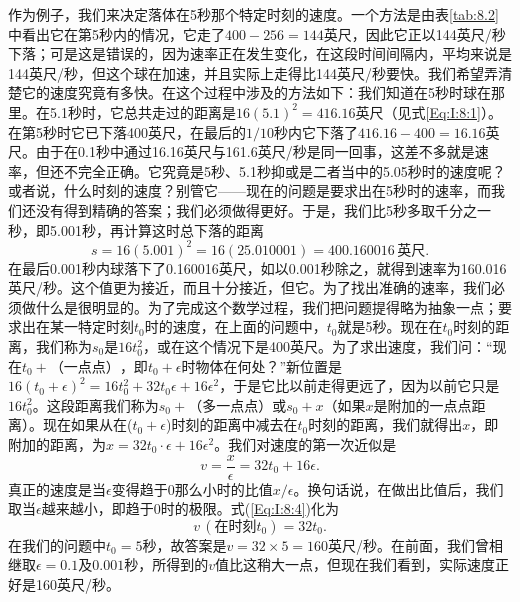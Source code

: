 作为例子，我们来决定落体在5秒那个特定时刻的速度。一个方法是由表\ref{tab:8.2}中看出它在第5秒内的情况，它走了$400-256=144$英尺，因此它正以144英尺/秒下落；可是这是错误的，因为速率正在发生变化，在这段时间间隔内，平均来说是144英尺/秒，但这个球在加速，并且实际上走得比144英尺/秒要快。我们希望弄清楚它的速度究竟有多快。在这个过程中涉及的方法如下：我们知道在5秒时球在那里。在5.1秒时，它总共走过的距离是$16(5.1)^2=416.16$英尺（见式\ref{Eq:I:8:1}）。在第5秒时它已下落400英尺，在最后的$1/10$秒内它下落了$416.16-400=16.16$英尺。由于在0.1秒中通过16.16英尺与161.6英尺/秒是同一回事，这差不多就是速率，但还不完全正确。它究竟是5秒、5.1秒抑或是二者当中的5.05秒时的速度呢？或者说，什么时刻的速度？别管它——现在的问题是要求出在5秒时的速率，而我们还没有得到精确的答案；我们必须做得更好。于是，我们比5秒多取千分之一秒，即5.001秒，再计算这时总下落的距离
\begin{equation*}
s=16(5.001)^2=16(25.010001)=400.160016 \,\textrm{英尺}.
\end{equation*}
在最后0.001秒内球落下了0.160016英尺，如以0.001秒除之，就得到速率为160.016英尺/秒。这个值更为接近，而且十分接近，但它。为了找出准确的速率，我们必须做什么是很明显的。为了完成这个数学过程，我们把问题提得略为抽象一点；要求出在某一特定时刻$t_0$时的速度，在上面的问题中，$t_0$就是5秒。现在在$t_0$时刻的距离，我们称为$s_0$是$16t_0^2$，或在这个情况下是400英尺。为了求出速度，我们问：“现在$t_0+\textrm{（一点点）}$，即$t_0+\epsilon$时物体在何处？”新位置是$16(t_0+\epsilon)^2=16t_0^2+32t_0\epsilon+16\epsilon^2$，于是它比以前走得更远了，因为以前它只是$16t_0^2$。这段距离我们称为$s_0+\textrm{（多一点点）}$或$s_0+x$（如果$x$是附加的一点点距离）。现在如果从在($t_0+\epsilon$)时刻的距离中减去在$t_0$时刻的距离，我们就得出$x$，即附加的距离，为$x=32t_0\cdot\epsilon+16\epsilon^2$。我们对速度的第一次近似是
\begin{equation}
\label{Eq:I:8:4}
v=\frac{x}{\epsilon}=32t_0+16\epsilon.
\end{equation}
真正的速度是当$\epsilon$变得趋于0那么小时的比值$x/\epsilon$。换句话说，在做出比值后，我们取当$\epsilon$越来越小，即趋于0时的极限。式(\ref{Eq:I:8:4})化为
\begin{equation*}
v\,(\textrm{在时刻$t_0$})=32t_0.
\end{equation*}
在我们的问题中$t_0=5$秒，故答案是$v=32\times5=160$英尺/秒。在前面，我们曾相继取$\epsilon=0.1$及$0.001$秒，所得到的$v$值比这稍大一点，但现在我们看到，实际速度正好是160英尺/秒。




